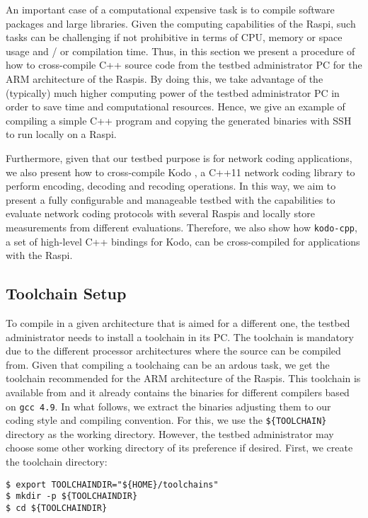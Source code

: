 \label{sec:cross_compilation}
An important case of a computational expensive task is to compile software
packages and large libraries. Given the computing capabilities of the
\ac{Raspi}, such tasks can be challenging if not prohibitive in terms of
\ac{CPU}, memory or space usage and / or compilation time. Thus, in
this section we present a procedure of how to cross-compile C++
source code from the testbed administrator \ac{PC} for the \ac{ARM}
architecture of the \ac{Raspi}s. By doing this, we take advantage
of the (typically) much higher computing power of the testbed
administrator \ac{PC} in order to save time and computational resources.
Hence, we give an example of compiling a simple C++ program and
copying the generated binaries with \ac{SSH} to run locally
on a \ac{Raspi}.

Furthermore, given that our testbed purpose is for
network coding applications, we also present how to cross-compile Kodo
\cite{kodo2011pedersen}, a C++11 network coding library to perform
encoding, decoding and recoding operations. In this way, we aim to present
a fully configurable and manageable testbed with the capabilities to
evaluate network coding protocols with several \ac{Raspi}s and locally
store measurements from different evaluations. Therefore, we also show
how \texttt{kodo-cpp}, a set of high-level C++ bindings for Kodo, can be
cross-compiled for applications with the \ac{Raspi}.

\subsection{Toolchain Setup}
To compile in a given architecture that is aimed for a different one,
the testbed administrator needs to install a toolchain in its \ac{PC}.
The toolchain is mandatory due to the different processor architectures
where the source can be compiled from.
Given that compiling a toolchaing can be an ardous task, we get the toolchain
recommended for the \ac{ARM} architecture of the \ac{Raspi}s.
This toolchain is available from \cite{2016rpitoolchain} and
it already contains the binaries for different compilers based on
\texttt{gcc 4.9}. In what follows, we extract the binaries adjusting
them to our coding style and compiling convention. For this, we use the
\texttt{\$\{TOOLCHAIN\}} directory as the working directory. However,
the testbed administrator may choose some other working directory of
its preference if desired. First, we create the toolchain directory:

\begin{lstlisting}[]
$ export TOOLCHAINDIR="${HOME}/toolchains"
$ mkdir -p ${TOOLCHAINDIR}
$ cd ${TOOLCHAINDIR}
\end{lstlisting}
\FloatBarrier
\vspace{-5mm}


